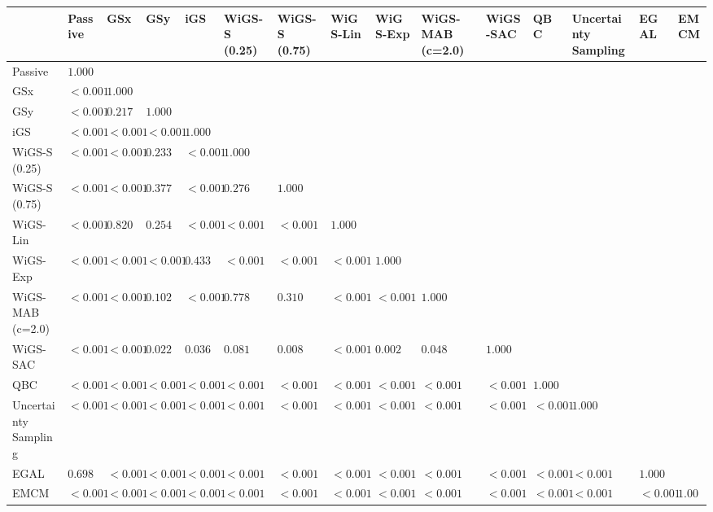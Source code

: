 \begin{tabular}{lllllllllllllll}
\toprule
 & Passive & GSx & GSy & iGS & WiGS-S (0.25) & WiGS-S (0.75) & WiGS-Lin & WiGS-Exp & WiGS-MAB (c=2.0) & WiGS-SAC & QBC & Uncertainty Sampling & EGAL & EMCM \\
\midrule
Passive & $1.000$ &  &  &  &  &  &  &  &  &  &  &  &  &  \\
GSx & $<0.001$ & $1.000$ &  &  &  &  &  &  &  &  &  &  &  &  \\
GSy & $<0.001$ & $0.217$ & $1.000$ &  &  &  &  &  &  &  &  &  &  &  \\
iGS & $<0.001$ & $<0.001$ & $<0.001$ & $1.000$ &  &  &  &  &  &  &  &  &  &  \\
WiGS-S (0.25) & $<0.001$ & $<0.001$ & $0.233$ & $<0.001$ & $1.000$ &  &  &  &  &  &  &  &  &  \\
WiGS-S (0.75) & $<0.001$ & $<0.001$ & $0.377$ & $<0.001$ & $0.276$ & $1.000$ &  &  &  &  &  &  &  &  \\
WiGS-Lin & $<0.001$ & $0.820$ & $0.254$ & $<0.001$ & $<0.001$ & $<0.001$ & $1.000$ &  &  &  &  &  &  &  \\
WiGS-Exp & $<0.001$ & $<0.001$ & $<0.001$ & $0.433$ & $<0.001$ & $<0.001$ & $<0.001$ & $1.000$ &  &  &  &  &  &  \\
WiGS-MAB (c=2.0) & $<0.001$ & $<0.001$ & $0.102$ & $<0.001$ & $0.778$ & $0.310$ & $<0.001$ & $<0.001$ & $1.000$ &  &  &  &  &  \\
WiGS-SAC & $<0.001$ & $<0.001$ & $0.022$ & $0.036$ & $0.081$ & $0.008$ & $<0.001$ & $0.002$ & $0.048$ & $1.000$ &  &  &  &  \\
QBC & $<0.001$ & $<0.001$ & $<0.001$ & $<0.001$ & $<0.001$ & $<0.001$ & $<0.001$ & $<0.001$ & $<0.001$ & $<0.001$ & $1.000$ &  &  &  \\
Uncertainty Sampling & $<0.001$ & $<0.001$ & $<0.001$ & $<0.001$ & $<0.001$ & $<0.001$ & $<0.001$ & $<0.001$ & $<0.001$ & $<0.001$ & $<0.001$ & $1.000$ &  &  \\
EGAL & $0.698$ & $<0.001$ & $<0.001$ & $<0.001$ & $<0.001$ & $<0.001$ & $<0.001$ & $<0.001$ & $<0.001$ & $<0.001$ & $<0.001$ & $<0.001$ & $1.000$ &  \\
EMCM & $<0.001$ & $<0.001$ & $<0.001$ & $<0.001$ & $<0.001$ & $<0.001$ & $<0.001$ & $<0.001$ & $<0.001$ & $<0.001$ & $<0.001$ & $<0.001$ & $<0.001$ & $1.000$ \\
\bottomrule
\end{tabular}

